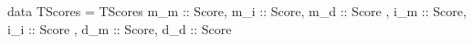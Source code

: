 data TScores = TScores
  { m_m :: Score, m_i :: Score, m_d :: Score
  , i_m :: Score, i_i :: Score
  , d_m :: Score, d_d :: Score }
